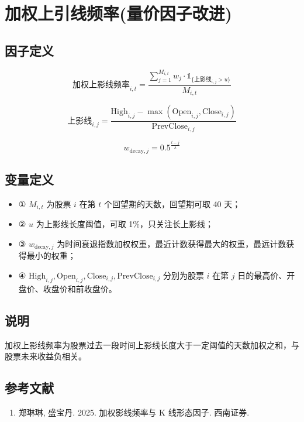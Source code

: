 \documentclass{article}
\begin{document}
\section{加权上引线频率(量价因子改进)}

\subsection{因子定义}

\begin{equation}
    \text{加权上影线频率}_{i,t} = \frac{\sum_{j=1}^{M_{i,t}} w_j \cdot \mathbb{1}_{\{ \text{上影线}_{i,j} > u \}}}{M_{i,t}}
\end{equation}

\begin{equation}
    \text{上影线}_{i,j} = \frac{\mathrm{High}_{i,j} - \max(\mathrm{Open}_{i,j}, \mathrm{Close}_{i,j})}{\mathrm{PrevClose}_{i,j}}
\end{equation}

\begin{equation}
    w_{\mathrm{decay},j} = 0.5^{\frac{t-j}{\lambda}}
\end{equation}

\subsection{变量定义}
\begin{itemize}
    \item ① \( M_{i,t} \) 为股票 \( i \) 在第 \( t \) 个回望期的天数，回望期可取 40 天；
    \item ② \( u \) 为上影线长度阈值，可取 1\%，只关注长上影线；
    \item ③ \( w_{\mathrm{decay},j} \) 为时间衰退指数加权权重，最近计数获得最大的权重，最远计数获得最小的权重；
    \item ④ \( \mathrm{High}_{i,j}, \mathrm{Open}_{i,j}, \mathrm{Close}_{i,j}, \mathrm{PrevClose}_{i,j} \) 分别为股票 \( i \) 在第 \( j \) 日的最高价、开盘价、收盘价和前收盘价。
\end{itemize}

\subsection{说明}
加权上影线频率为股票过去一段时间上影线长度大于一定阈值的天数加权之和，与股票未来收益负相关。

\subsection{参考文献}
\begin{enumerate}
    \item 郑琳琳, 盛宝丹. 2025. 加权影线频率与 K 线形态因子. 西南证券.
\end{enumerate}
\end{document}
